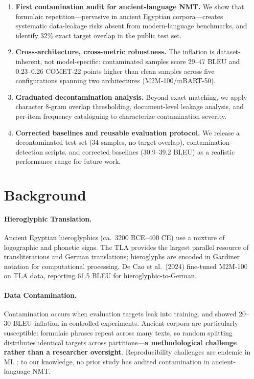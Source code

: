 \documentclass[11pt,a4paper]{article}
\begin{document}
\begin{enumerate}
    \item \textbf{First contamination audit for ancient-language NMT.} We show that formulaic repetition---pervasive in ancient Egyptian corpora---creates systematic data-leakage risks absent from modern-language benchmarks, and identify 32\% exact target overlap in the public test set.
    
    \item \textbf{Cross-architecture, cross-metric robustness.} The inflation is dataset-inherent, not model-specific: contaminated samples score 29--47 BLEU and 0.23--0.26 COMET-22 points higher than clean samples across five configurations spanning two architectures (M2M-100/mBART-50).

    \item \textbf{Graduated decontamination analysis.} Beyond exact matching, we apply character 8-gram overlap thresholding, document-level leakage analysis, and per-item frequency cataloguing to characterize contamination severity.

    \item \textbf{Corrected baselines and reusable evaluation protocol.} We release a decontaminated test set (34 samples, no target overlap), contamination-detection scripts, and corrected baselines (30.9--39.2 BLEU) as a realistic performance range for future work.
\end{enumerate}

\section{Background}
\label{sec:background}

\paragraph{Hieroglyphic Translation.}
Ancient Egyptian hieroglyphics (ca.\ 3200 BCE--400 CE) use a mixture of logographic and phonetic signs. The TLA provides the largest parallel resource of transliterations and German translations; hieroglyphs are encoded in Gardiner notation for computational processing.
De Cao et al.\ (2024) fine-tuned M2M-100 \citep{fan2021beyond} on TLA data, reporting 61.5 BLEU for hieroglyphic-to-German.

\paragraph{Data Contamination.}
Contamination occurs when evaluation targets leak into training. \citet{magar2022data} and \citet{kocyigit2025overestimation} showed 20--30 BLEU inflation in controlled experiments. Ancient corpora are particularly susceptible: formulaic phrases repeat across many texts, so random splitting distributes identical targets across partitions---\textbf{a methodological challenge rather than a researcher oversight}. Reproducibility challenges are endemic in ML \citep{pineau2021improving}; to our knowledge, no prior study has audited contamination in ancient-language NMT.
\end{document}
